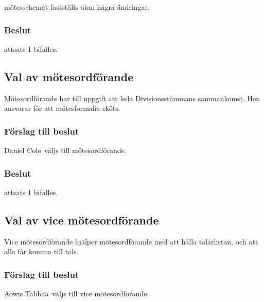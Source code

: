 \documentclass[protokoll]{dvd}
\def\ordf{Daniel Cole}
\def\kassa{Aowis Tabbaa}
\begin{document}
\begin{attsatser}
    \item mötesschemat fastställs utan några ändringar.
\end{attsatser}

\subsubsection*{Beslut}
\begin{attsatser}
    \item attsats 1 bifalles.
\end{attsatser}

\subsection{Val av mötesordförande}

Mötesordförande har till uppgift att leda Divisionsstämmans sammankomst.
Hen ansvarar för att mötesformalia sköts.



\subsubsection*{Förslag till beslut}
\begin{attsatser}
    \item \ordf\ väljs till mötesordförande.
\end{attsatser}

\subsubsection*{Beslut}
\begin{attsatser}
    \item attsats 1 bifalles.
\end{attsatser}

\subsection{Val av vice mötesordförande}

Vice mötesordförande hjälper mötesordförande med att hålla talarlistan, och att alla får komma till tals.

\subsubsection*{Förslag till beslut}
\begin{attsatser}
    \item \kassa\ väljs till vice mötesordförande
\end{attsatser}
\end{document}
